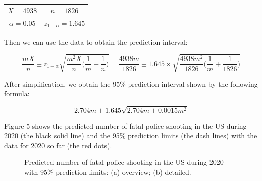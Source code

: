 \documentclass[a4paper]{article}
\begin{document}
	\begin{table}[H]
	\centering
	\begin{tabular}{cc}
	$X=4938$&$n=1826$\\
	$\alpha=0.05$&$z_{1-\alpha}=1.645$\\
	\end{tabular}
	\end{table}
	
	Then we can use the data to obtain the prediction interval:
	
	$$\frac{mX}{n}\pm z_{1-\alpha}\sqrt{\frac{m^2X}{n}\bigg(\frac{1}{m}+\frac{1}{n}\bigg)}=\frac{4938m}{1826}\pm1.645\times\sqrt{\frac{4938m^2}{1826}\bigg(\frac{1}{m}+\frac{1}{1826}\bigg)}$$
	
	After simplification, we obtain the 95\% prediction interval shown by the following formula:
	
	\begin{equation}
	2.704m\pm1.645\sqrt{2.704m+0.0015m^2}
	\end{equation}

	Figure 5 shows the predicted number of fatal police shooting in the US during 2020 (the black solid line) and the 95\% prediction limits (the dash lines) with the data for 2020 so far (the red dots).
	
	\begin{figure}[H]
    \centering
	\caption{Predicted number of fatal police shooting in the US during 2020 with 95\% prediction limits: (a) overview; (b) detailed.}
    \end{figure}
    
\end{document}
